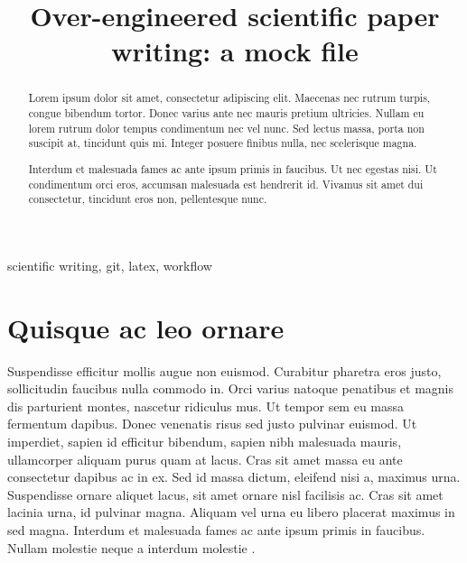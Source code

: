 \documentclass[conference]{IEEEtran}
\begin{document}
\title{Over-engineered scientific paper writing: a mock file}


\author{
}

\maketitle

\begin{abstract}
Lorem ipsum dolor sit amet, consectetur adipiscing elit. Maecenas nec rutrum turpis, congue bibendum
tortor. Donec varius ante nec mauris pretium ultricies. Nullam eu lorem rutrum dolor tempus
condimentum nec vel nunc. Sed lectus massa, porta non suscipit at, tincidunt quis mi. Integer
posuere finibus nulla, nec scelerisque magna. 

Interdum et malesuada fames ac ante ipsum primis in faucibus. Ut nec egestas nisi. Ut condimentum
orci eros, accumsan malesuada est hendrerit id. Vivamus sit amet dui consectetur, tincidunt eros
non, pellentesque nunc. 
\end{abstract}

\begin{IEEEkeywords}
  scientific writing, git, latex, workflow
\end{IEEEkeywords}



\section{Quisque ac leo ornare}

Suspendisse efficitur mollis augue non euismod. Curabitur pharetra eros justo, sollicitudin faucibus
nulla commodo in. Orci varius natoque penatibus et magnis dis parturient montes, nascetur ridiculus
mus. Ut tempor sem eu massa fermentum dapibus. Donec venenatis risus sed justo pulvinar euismod. Ut
imperdiet, sapien id efficitur bibendum, sapien nibh malesuada mauris, ullamcorper aliquam purus
quam at lacus. Cras sit amet massa eu ante consectetur dapibus ac in ex. Sed id massa dictum,
eleifend nisi a, maximus urna. Suspendisse ornare aliquet lacus, sit amet ornare nisl facilisis ac.
Cras sit amet lacinia urna, id pulvinar magna. Aliquam vel urna eu libero placerat maximus in sed
magna. Interdum et malesuada fames ac ante ipsum primis in faucibus. Nullam molestie neque a
interdum molestie \cite{Doe2020}.
\end{document}

